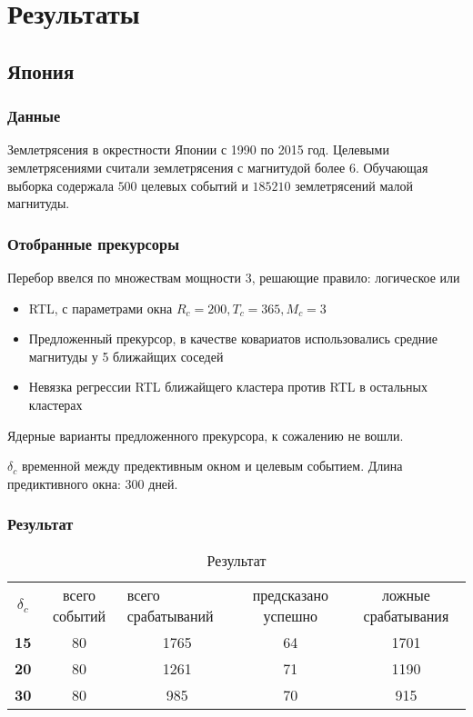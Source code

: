 \newpage

\section{Результаты}
\subsection{Япония}
\subsubsection*{Данные}
Землетрясения в окрестности Японии с 1990 по 2015 год. Целевыми землетрясениями считали землетрясения с магнитудой более $6$. Обучающая выборка содержала $500$ целевых событий и $185210$ землетрясений малой магнитуды.

\subsubsection*{Отобранные прекурсоры}
Перебор ввелся по множествам мощности 3, решающие правило: логическое или
\begin{itemize}
\item RTL, с параметрами окна $R_c = 200, T_c = 365, M_c = 3$ 
\item Предложенный прекурсор, в качестве ковариатов использовались средние магнитуды у 5 ближайщих соседей
\item Невязка регрессии RTL ближайщего кластера против RTL в остальных кластерах
\end{itemize}

Ядерные варианты предложенного прекурсора, к сожалению не вошли.

$\delta_c$ временной между предективным окном и целевым событием. Длина предиктивного окна: $300$ дней.

\subsubsection*{Результат}
\begin{table}[H]
\centering
\caption{Результат}
\label{my-label}
\begin{tabular}{ccccc}
$\delta_c$ & всего событий & \multicolumn{1}{l}{всего срабатываний} & предсказано успешно & ложные срабатывания \\
\textbf{15} & 80 & 1765 & 64 & 1701 \\
\textbf{20} & 80 & 1261 & 71 & 1190 \\
\textbf{30} & 80 & 985 & 70 & 915
\end{tabular}
\end{table}

